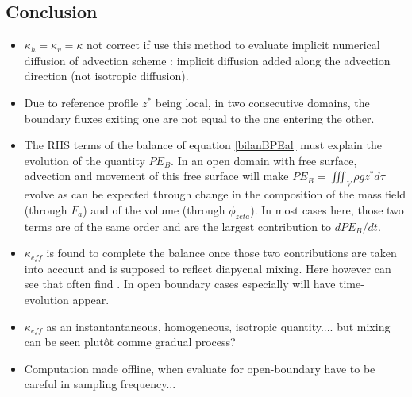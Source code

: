 \subsection{Conclusion}

\begin{itemize}
\item $\kappa_h=\kappa_v=\kappa$ not correct if use this method to evaluate implicit numerical diffusion of advection scheme : implicit diffusion added along the advection direction (not isotropic diffusion).
\item Due to reference profile $z^*$ being local, in two consecutive domains, the boundary fluxes exiting one are not equal to the one entering the other. 
\item The RHS terms of the balance of equation \ref{bilanBPEal} must explain the evolution of the quantity $PE_B$. In an open domain with free surface, advection and movement of this free surface will make $PE_B=\iiint_V \rho g z^* d\tau$ evolve as can be expected through change in the composition of the mass field (through $F_a$) and of the volume (through $\phi_{zeta}$). In most cases here, those two terms are of the same order and are the largest contribution to $dPE_B/dt$.
\item $\kappa_{eff}$ is found to complete the balance once those two contributions are taken into account and is supposed to reflect diapycnal mixing. Here however can see that often find . In open boundary cases especially will have time-evolution appear.
\item $\kappa_{eff}$ as an instantantaneous, homogeneous, isotropic quantity.... but mixing can be seen plutôt comme gradual process?
\item Computation made offline, when evaluate for open-boundary have to be careful in sampling frequency...
\end{itemize}

